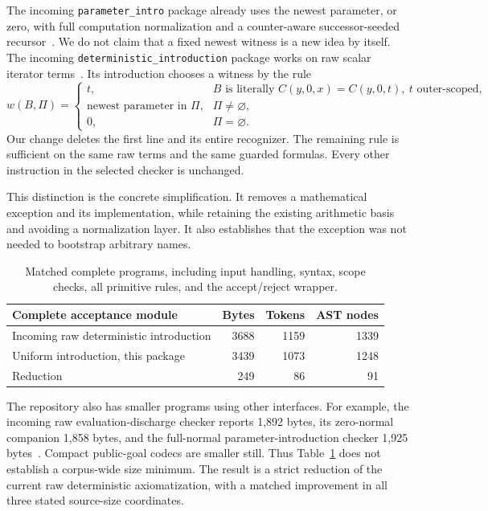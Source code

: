 \documentclass[11pt]{article}
\theoremstyle{definition}\newtheorem{definition}[theorem]{Definition}
\theoremstyle{remark}\newtheorem{remark}[theorem]{Remark}
\newcommand{\code}[1]{\texttt{#1}}
\begin{document}
The incoming \code{parameter\_intro} package already uses the newest
parameter, or zero, with full computation normalization and a
counter-aware successor-seeded recursor~\cite{parameter}. We do not claim
that a fixed newest witness is a new idea by itself. The incoming
\code{deterministic\_introduction} package works on raw scalar iterator
terms~\cite{deterministic}. Its introduction chooses a witness by the rule
\[
 w(B,\Pi)=
 \begin{cases}
 t,&B\text{ is literally }C(y,0,x)=C(y,0,t),\ t\text{ outer-scoped},\\
 \text{newest parameter in }\Pi,&\Pi\ne\varnothing,\\
 0,&\Pi=\varnothing.
 \end{cases}
\]
Our change deletes the first line and its entire recognizer. The remaining
rule is sufficient on the same raw terms and the same guarded formulas.
Every other instruction in the selected checker is unchanged.

This distinction is the concrete simplification. It removes a mathematical
exception and its implementation, while retaining the existing arithmetic
basis and avoiding a normalization layer. It also establishes that the
exception was not needed to bootstrap arbitrary names.

\begin{table}[h]
\centering
\begin{tabular}{lrrr}
\toprule
Complete acceptance module & Bytes & Tokens & AST nodes\\
\midrule
Incoming raw deterministic introduction & 3688 & 1159 & 1339\\
Uniform introduction, this package & 3439 & 1073 & 1248\\
Reduction & 249 & 86 & 91\\
\bottomrule
\end{tabular}
\caption{Matched complete programs, including input handling, syntax,
scope checks, all primitive rules, and the accept/reject wrapper.}
\label{tab:main-size}
\end{table}

The repository also has smaller programs using other interfaces. For
example, the incoming raw evaluation-discharge checker reports 1,892
bytes, its zero-normal companion 1,858 bytes, and the full-normal
parameter-introduction checker 1,925 bytes~\cite{evaluation,parameter}.
Compact public-goal codecs are smaller still. Thus Table~\ref{tab:main-size}
does not establish a corpus-wide size minimum. The result is a strict
reduction of the current raw deterministic axiomatization, with a matched
improvement in all three stated source-size coordinates.
\end{document}

